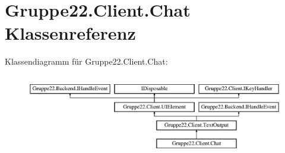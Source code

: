 \hypertarget{class_gruppe22_1_1_client_1_1_chat}{\section{Gruppe22.\-Client.\-Chat Klassenreferenz}
\label{class_gruppe22_1_1_client_1_1_chat}
}
Klassendiagramm für Gruppe22.\-Client.\-Chat\-:\begin{figure}[H]
\begin{center}
\leavevmode
\includegraphics[height=3.589744cm]{class_gruppe22_1_1_client_1_1_chat}
\end{center}
\end{figure}
